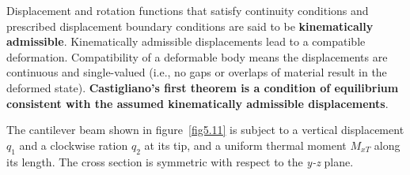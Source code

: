 \documentclass{AeroStructure-ERJohnson}
\begin{document}
Displacement and rotation functions that satisfy continuity conditions and prescribed displacement boundary conditions are said to be \textbf{kinematically admissible}. Kinematically admissible displacements lead to a compatible deformation. Compatibility of a deformable body means the displacements are continuous and single-valued (i.e., no gaps or overlaps of material result in the deformed state). \textbf{Castigliano's first theorem is a condition of equilibrium consistent with the assumed kinematically admissible displacements}.

\clearpage

\begin{example}\label{ex5.1}\setcounter{equation}{0}\def\theequation{\alph{equation}}The cantilever beam shown in figure~\ref{fig5.11} is subject to a vertical displacement $q_1$ and a clockwise ration $q_2$ at its tip, and a uniform thermal moment $M_{xT}$ along its length. The cross section is symmetric with respect to the \textit{y-z} plane.



\end{example}
\end{document}
